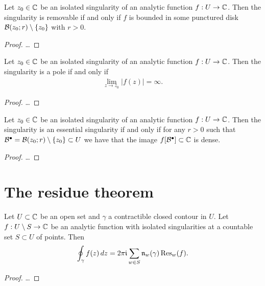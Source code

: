 \begin{theorem}
  \label{thm:removable_singularity}
  Let $z_0 \in \bC$ be an isolated singularity of
  an analytic function $f : U \to \bC$.
  Then the singularity is removable if and only if
  $f$ is bounded in some punctured disk $\BallRC{r}{z_0} \setminus \{z_0\}$
  with $r>0$.
\end{theorem}
\begin{proof}
  \ldots
\end{proof}

\begin{theorem}
  \label{thm:pole}
  Let $z_0 \in \bC$ be an isolated singularity of
  an analytic function $f : U \to \bC$.
  Then the singularity is a pole if and only if
  \begin{align*}
    \lim_{z \to z_0} | f(z) | = \infty .
  \end{align*}
\end{theorem}
\begin{proof}
  \ldots
\end{proof}

\begin{theorem}
  \label{thm:essential_singularity}
  Let $z_0 \in \bC$ be an isolated singularity of
  an analytic function $f : U \to \bC$.
  Then the singularity is an essential singularity if and only if
  for any $r>0$ such that $\PDisk = \BallRC{r}{z_0} \setminus \{z_0\} \subset U$
  we have that the image $f[\PDisk] \subset \bC$ is dense.
\end{theorem}
\begin{proof}
  \ldots
\end{proof}



\section{The residue theorem}

\begin{theorem}
  \label{thm:RESIDUE_THEOREM}
  Let $U \subset \bC$ be an open set and $\gamma$ a contractible closed contour in $U$.
  Let $f : U \setminus S \to \bC$ be an analytic function with isolated
  singularities at a countable set $S \subset U$ of points.
  Then
  \begin{align*}
    \oint_\gamma f(z) \, dz
      = 2 \pi \ii \sum_{w \in S} \windN{w}{\gamma} \, \ResAtOf{w}{f} .
  \end{align*}
\end{theorem}
\begin{proof}
  \ldots
\end{proof}

